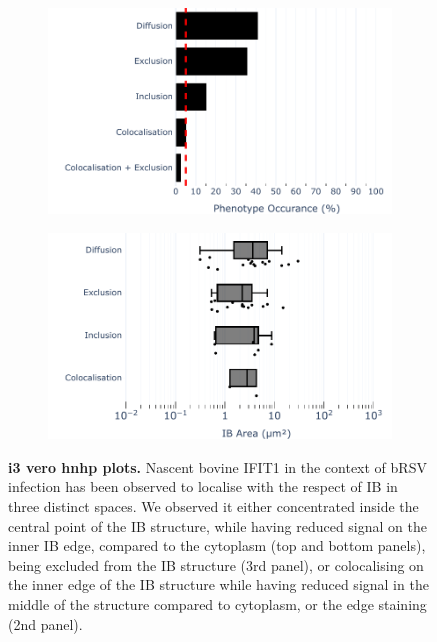 \begin{figure}
    \begin{subfigure}{0.5\textwidth}
        \caption{}
        \includegraphics[width=1\linewidth]{09. Chapter 4/Figs/03. pIB/02. IFIT3/01. bar_i3_vero.pdf} 
    \end{subfigure}
    \begin{subfigure}{0.5\textwidth}
        \caption{}
        \includegraphics[width=1\linewidth]{09. Chapter 4/Figs/03. pIB/02. IFIT3/02. box_i3_vero.pdf}
    \end{subfigure}
    \caption[i3 vero hnhp plots]{\textbf{i3 vero hnhp plots.} Nascent bovine IFIT1 in the context of bRSV infection has been observed to localise with the respect of IB in three distinct spaces. We observed it either concentrated inside the central point of the IB structure, while having reduced signal on the inner IB edge, compared to the cytoplasm (top and bottom panels), being excluded from the IB structure (3rd panel), or colocalising on the inner edge of the IB structure while having reduced signal in the middle of the structure compared to cytoplasm, or the edge staining (2nd panel).}
    \label{fig:i3 vero hnhp plots}
\end{figure}

